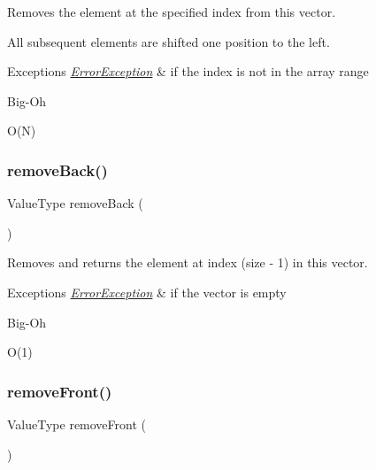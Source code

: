 Removes the element at the specified index from this vector. 

All subsequent elements are shifted one position to the left. 
\begin{DoxyExceptions}{Exceptions}
{\em \mbox{\hyperlink{classErrorException}{Error\+Exception}}} & if the index is not in the array range \\
\hline
\end{DoxyExceptions}
\begin{DoxyRefDesc}{Big-\/\+Oh}
\item[\mbox{\hyperlink{BigOh__BigOh000126}{Big-\/\+Oh}}]O(\+N) \end{DoxyRefDesc}
\mbox{\label{classVector_af7878e9c2f67e06cbae525e9fa77e38e}} 
\subsubsection{\texorpdfstring{remove\+Back()}{removeBack()}}
{\footnotesize\ttfamily Value\+Type remove\+Back (\begin{DoxyParamCaption}{ }\end{DoxyParamCaption})}



Removes and returns the element at index (size -\/ 1) in this vector. 


\begin{DoxyExceptions}{Exceptions}
{\em \mbox{\hyperlink{classErrorException}{Error\+Exception}}} & if the vector is empty \\
\hline
\end{DoxyExceptions}
\begin{DoxyRefDesc}{Big-\/\+Oh}
\item[\mbox{\hyperlink{BigOh__BigOh000128}{Big-\/\+Oh}}]O(1) \end{DoxyRefDesc}
\mbox{\label{classVector_a02453aa96e93c38ca4c1d176307c8a63}} 
\subsubsection{\texorpdfstring{remove\+Front()}{removeFront()}}
{\footnotesize\ttfamily Value\+Type remove\+Front (\begin{DoxyParamCaption}{ }\end{DoxyParamCaption})}



